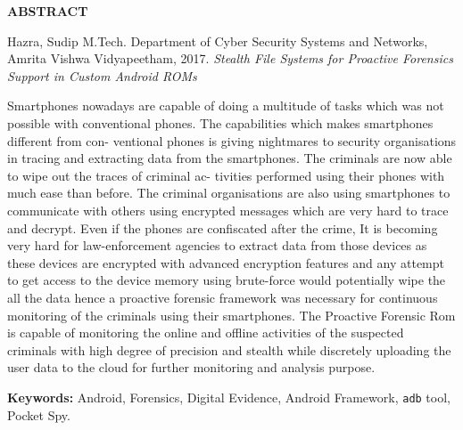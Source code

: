 \newpage
\thispagestyle{plain}

{\centering\bf ABSTRACT\\}\par\vskip 2cm

\singleSpacing

\noindent
Hazra, Sudip %
M.Tech.  Department of Cyber Security Systems and Networks,
Amrita Vishwa Vidyapeetham,
2017.                           %
{\sl Stealth File Systems for Proactive
Forensics Support in Custom Android
ROMs} %

\par\vskip 1cm

\doubleSpacing

Smartphones nowadays are capable of doing a multitude of tasks which was not possible
with conventional phones. The capabilities which makes smartphones different from con-
ventional phones is giving nightmares to security organisations in tracing and extracting
data from the smartphones. The criminals are now able to wipe out the traces of criminal ac-
tivities performed using their phones with much ease than before. The criminal organisations
are also using smartphones to communicate with others using encrypted messages which are
very hard to trace and decrypt. Even if the phones are confiscated after the crime, It is becoming very hard for law-enforcement agencies to extract data from those devices as these devices are encrypted with advanced encryption features and any attempt to get access to the device memory using brute-force would potentially wipe the all the data hence a proactive forensic framework was necessary for continuous monitoring of the criminals using their smartphones. The Proactive Forensic Rom is capable of monitoring the online and offline activities of the suspected criminals with high degree of precision and stealth while discretely uploading the user data to the cloud for further monitoring and analysis purpose.
\vfill

\noindent
{\bf Keywords:} Android, Forensics, Digital Evidence, Android
Framework, {\tt adb} tool, Pocket Spy.

\newpage




